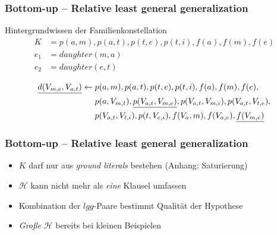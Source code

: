\begin{frame}
	\frametitle{Bottom-up -- Relative least general generalization}
	\begin{block}{Hintergrundwissen der Familienkonstellation}
		\begin{align*}
			K   &= p(a,m), p(a,t), p(t,e), p(t,i), f(a), f(m), f(e)\\
			e_1 &= daughter(m, a)\\
			e_2 &= daughter(e, t)
		\end{align*}
	\end{block}

	\begin{gather*}
		\begin{split}
			\emph{d(V_{m,e}, V_{a,t})} \leftarrow &\; p(a,m), p(a,t), p(t,e), p(t,i), f(a), f(m), f(e),\\
			&\; p(a, V_{m,t}), \emph{p(V_{a,t}, V_{m,e})}, p(V_{a,t}, V_{m,i}), p(V_{a,t}, V_{t,e}),\\
			&\; p(V_{a,t}, V_{t,i}) ,p(t, V_{e,i}), f(V_a, m), f(V_{a,e}), \emph{f(V_{m,e})}
		\end{split}
	\end{gather*}
\end{frame}

\begin{frame}
	\frametitle{Bottom-up -- Relative least general generalization}
	\begin{itemize}
		\item $K$ darf nur aus \textit{ground literals} bestehen (Anhang: Saturierung)
		\item $\mathcal{H}$ kann nicht mehr als \emph{eine} Klausel umfassen
		\item Kombination der $lgg$-Paare bestimmt Qualität der Hypothese
		\item \emph{Große} $\mathcal{H}$ bereits bei kleinen Beispielen

	\end{itemize}
\end{frame}


